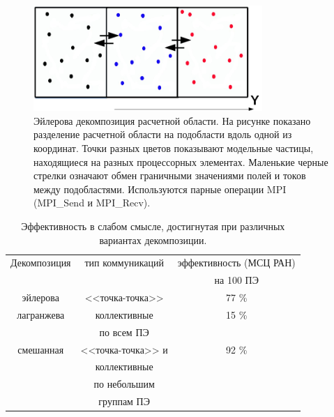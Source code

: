 \begin{figure}[ht]
	\begin{center}
		\includegraphics[height=4cm,keepaspectratio]{images/decomp_Eu.png}
	\end{center}
	\caption{Эйлерова декомпозиция расчетной области. На рисунке показано разделение расчетной области на подобласти вдоль одной из координат. Точки разных цветов показывают модельные частицы, находящиеся на разных процессорных  элементах. Маленькие черные стрелки означают обмен граничными значениями полей и токов между подобластями. Используются парные операции MPI (MPI\_Send и MPI\_Recv).}
	\label{Lag_dec}
\end{figure}





\begin{table}[ht]
\begin{center}
\caption{Эффективность в слабом смысле, достигнутая при различных вариантах декомпозиции.}
\begin{tabular}{|c|c|c|}
\hline
Декомпозиция & тип коммуникаций        &  эффективность (МСЦ РАН) \\
             &                         &  на 100 ПЭ\\ \hline
эйлерова     & <<точка-точка>>         &   77 \%  \\ \hline
 лагранжева  & коллективные            &   15 \%  \\
             &  по всем ПЭ             &        \\ \hline
 смешанная   & <<точка-точка>> и       &   92 \%  \\ 
             & коллективные            &       \\
             & по небольшим            &        \\ 
             & группам ПЭ              &      \\ \hline 
\end{tabular}
\end{center}
\end{table}


